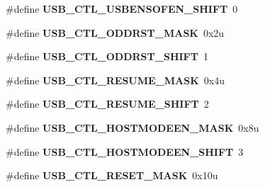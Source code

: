 \begin{DoxyCompactItemize}
\item 
\hypertarget{group___u_s_b___register___masks_ga674ca18da1675b8ae48c65ca4203da36}{}\#define {\bfseries U\+S\+B\+\_\+\+C\+T\+L\+\_\+\+U\+S\+B\+E\+N\+S\+O\+F\+E\+N\+\_\+\+S\+H\+I\+F\+T}~0\label{group___u_s_b___register___masks_ga674ca18da1675b8ae48c65ca4203da36}

\item 
\hypertarget{group___u_s_b___register___masks_ga70907cc5c00bad68669ef02ec1332bfc}{}\#define {\bfseries U\+S\+B\+\_\+\+C\+T\+L\+\_\+\+O\+D\+D\+R\+S\+T\+\_\+\+M\+A\+S\+K}~0x2u\label{group___u_s_b___register___masks_ga70907cc5c00bad68669ef02ec1332bfc}

\item 
\hypertarget{group___u_s_b___register___masks_ga6e2ea6a3166748c567d22a767c69f98d}{}\#define {\bfseries U\+S\+B\+\_\+\+C\+T\+L\+\_\+\+O\+D\+D\+R\+S\+T\+\_\+\+S\+H\+I\+F\+T}~1\label{group___u_s_b___register___masks_ga6e2ea6a3166748c567d22a767c69f98d}

\item 
\hypertarget{group___u_s_b___register___masks_ga4e385fa5cf2157ef30a39c1c2b766cd3}{}\#define {\bfseries U\+S\+B\+\_\+\+C\+T\+L\+\_\+\+R\+E\+S\+U\+M\+E\+\_\+\+M\+A\+S\+K}~0x4u\label{group___u_s_b___register___masks_ga4e385fa5cf2157ef30a39c1c2b766cd3}

\item 
\hypertarget{group___u_s_b___register___masks_gab8354dafb3b0cb438770fe60ffec4714}{}\#define {\bfseries U\+S\+B\+\_\+\+C\+T\+L\+\_\+\+R\+E\+S\+U\+M\+E\+\_\+\+S\+H\+I\+F\+T}~2\label{group___u_s_b___register___masks_gab8354dafb3b0cb438770fe60ffec4714}

\item 
\hypertarget{group___u_s_b___register___masks_gaddf09c4e93070675c5c93c711518250c}{}\#define {\bfseries U\+S\+B\+\_\+\+C\+T\+L\+\_\+\+H\+O\+S\+T\+M\+O\+D\+E\+E\+N\+\_\+\+M\+A\+S\+K}~0x8u\label{group___u_s_b___register___masks_gaddf09c4e93070675c5c93c711518250c}

\item 
\hypertarget{group___u_s_b___register___masks_ga87a32a06006794e2dd638fd2bb2eb788}{}\#define {\bfseries U\+S\+B\+\_\+\+C\+T\+L\+\_\+\+H\+O\+S\+T\+M\+O\+D\+E\+E\+N\+\_\+\+S\+H\+I\+F\+T}~3\label{group___u_s_b___register___masks_ga87a32a06006794e2dd638fd2bb2eb788}

\item 
\hypertarget{group___u_s_b___register___masks_ga6e3734900ace59f3dedf7a8f246721d7}{}\#define {\bfseries U\+S\+B\+\_\+\+C\+T\+L\+\_\+\+R\+E\+S\+E\+T\+\_\+\+M\+A\+S\+K}~0x10u\label{group___u_s_b___register___masks_ga6e3734900ace59f3dedf7a8f246721d7}


\end{DoxyCompactItemize}
